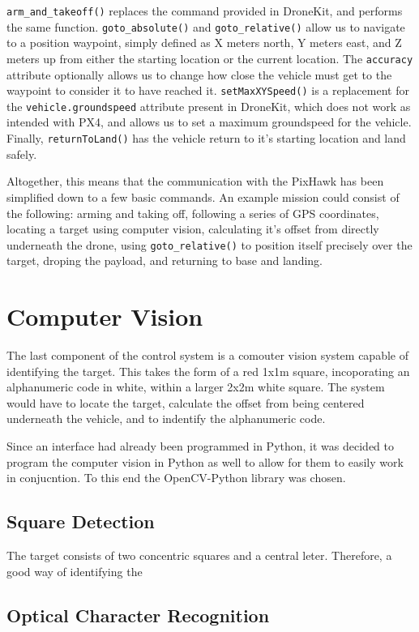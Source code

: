 \documentclass[10pt]{article}
\begin{document}
\lstinline|arm_and_takeoff()| replaces the command provided in DroneKit, and performs the same function. \lstinline|goto_absolute()| and \lstinline|goto_relative()| allow us to navigate to a position waypoint, simply defined as X meters north, Y meters east, and Z meters up from either the starting location or the current location. The \lstinline|accuracy| attribute optionally allows us to change how close the vehicle must get to the waypoint to consider it to have reached it. \lstinline|setMaxXYSpeed()| is a replacement for the \lstinline|vehicle.groundspeed| attribute present in DroneKit, which does not work as intended with PX4, and allows us to set a maximum groundspeed for the vehicle. Finally, \lstinline|returnToLand()| has the vehicle return to it's starting location and land safely.

Altogether, this means that the communication with the PixHawk has been simplified down to a few basic commands. An example mission could consist of the following: arming and taking off, following a series of GPS coordinates, locating a target using computer vision, calculating it's offset from directly underneath the drone, using \lstinline|goto_relative()| to position itself precisely over the target, droping the payload, and returning to base and landing.


\section{Computer Vision}
The last component of the control system is a comouter vision system capable of identifying the target. This takes the form of a red 1x1m square, incoporating an alphanumeric code in white, within a larger 2x2m white square\cite{IMechE_rules}. The system would have to locate the target, calculate the offset from being centered underneath the vehicle, and to indentify the alphanumeric code.

Since an interface had already been programmed in Python, it was decided to program the computer vision in Python as well to allow for them to easily work in conjucntion. To this end the OpenCV-Python library was chosen.

\subsection{Square Detection}
The target consists of two concentric squares and a central leter. Therefore, a good way of identifying the

\subsection{Optical Character Recognition}
\end{document}
